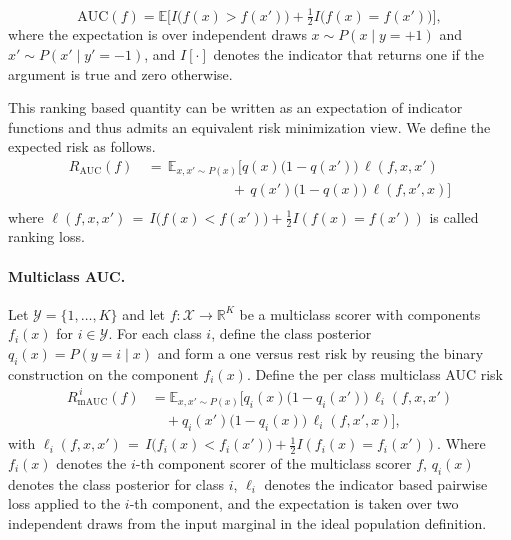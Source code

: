 \documentclass[10pt,twocolumn,letterpaper]{article}
\begin{document}
\begin{equation}
\mathrm{AUC}(f)= \mathbb{E}\big[I\big(f(x)>f(x')\big)
+ \tfrac{1}{2}I\big(f(x)=f(x')\big)\big],
\label{eq1}
\end{equation}
where the expectation is over independent draws $x\sim P(x\mid y=+1)$ and $x'\sim P(x'\mid y'=-1)$, and $I[\cdot]$ denotes the indicator that returns one if the argument is true and zero otherwise.

This ranking based quantity can be written as an expectation of indicator functions and thus admits an equivalent risk minimization view. We define the expected risk as follows.
\begin{equation}
\begin{aligned}
R_{\mathrm{AUC}}(f)\,&=\,\mathbb{E}_{x,x'\sim P(x)}\!\Big[q(x)\big(1-q(x')\big)\,\ell(f,x,x') \, \\
&\qquad\qquad\qquad+\, q(x')\big(1-q(x)\big)\,\ell(f,x',x)\big] \\
\end{aligned}
\end{equation}
where \(\ell(f,x,x') \,=\, I\!\big(f(x)<f(x')\big)+\frac{1}{2}I\!(f(x)=f(x'))\) is called ranking loss.

\paragraph{Multiclass AUC.}
Let $\mathcal{Y}=\{1,\ldots,K\}$ and let $f\!:\mathcal{X}\to\mathbb{R}^{K}$ be a multiclass scorer with components $f_{i}(x)$ for $i\in\mathcal{Y}$. For each class $i$, define the class posterior $q_{i}(x)=P(y=i\mid x)$ and form a one versus rest risk by reusing the binary construction on the component $f_{i}(x)$. Define the per class multiclass AUC risk
\begin{equation}
\begin{aligned}
R_{\mathrm{mAUC}}^{\,i}(f)
&=\mathbb{E}_{x,x'\sim P(x)}\!\Big[
q_{i}(x)\big(1-q_{i}(x')\big)\,\ell_{i}(f,x,x') \\
&\quad+q_{i}(x')\big(1-q_{i}(x)\big)\,\ell_{i}(f,x',x)
\Big],
\end{aligned}
\end{equation}
with \(\ell_i(f,x,x') \,=\, I\!\big(f_i(x)<f_i(x')\big)+\frac{1}{2}I\!(f_i(x)=f_i(x'))\). Where $f_{i}(x)$ denotes the $i$-th component scorer of the multiclass scorer $f$, $q_{i}(x)$ denotes the class posterior for class $i$, $\ell_{i}$ denotes the indicator based pairwise loss applied to the $i$-th component, and the expectation is taken over two independent draws from the input marginal in the ideal population definition. 
\end{document}
